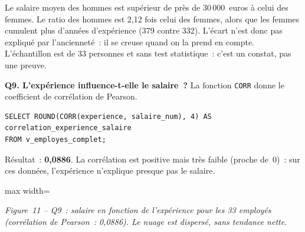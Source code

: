 \noindent Le salaire moyen des hommes est supérieur de près de 30\,000~euros à celui des femmes. Le ratio des hommes est 2,12 fois celui des femmes, alors que les femmes cumulent plus d'années d'expérience (379 contre 332). L'écart n'est donc pas expliqué par l'ancienneté~: il se creuse quand on la prend en compte. L'échantillon est de 33 personnes et sans test statistique~: c'est un constat, pas une preuve.

\medskip
{}
\noindent \textbf{Q9. L'expérience influence-t-elle le salaire~?} La fonction \texttt{CORR} donne le coefficient de corrélation de Pearson.

\begin{verbatim}
SELECT ROUND(CORR(experience, salaire_num), 4) AS correlation_experience_salaire
FROM v_employes_complet;
\end{verbatim}

\noindent Résultat~: \textbf{0,0886}.
La corrélation est positive mais très faible (proche de~0)~: sur ces données, l'expérience n'explique presque pas le salaire.

\begin{center}
\begin{adjustbox}{max width=\linewidth}
\end{adjustbox}\par\nobreak\smallskip
\small\textit{Figure~11 -- Q9~: salaire en fonction de l'expérience pour les 33 employés (corrélation de Pearson~: 0,0886). Le nuage est dispersé, sans tendance nette.}
\end{center}

